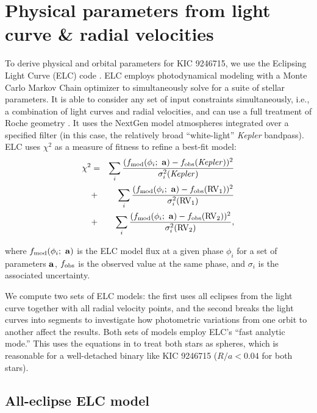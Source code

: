 \section{Physical parameters from light curve \& radial velocities}\label{model}
To derive physical and orbital parameters for KIC 9246715, we use the Eclipsing Light Curve (ELC) code \citep{oro00}. ELC employs photodynamical modeling with a Monte Carlo Markov Chain optimizer to simultaneously solve for a suite of stellar parameters. It is able to consider any set of input constraints simultaneously, i.e., a combination of light curves and radial velocities, and can use a full treatment of Roche geometry \citep{kop69,avn75}. It uses the NextGen model atmospheres integrated over a specified filter (in this case, the relatively broad ``white-light'' \emph{Kepler} bandpass). ELC uses $\chi^2$ as a measure of fitness to refine a best-fit model:
\begin{eqnarray}
\chi^2 & = &
\sum_i \frac{ (f_{\rm{mod}}(\phi_i; \ {\bf a}) - f_{\rm{obs}}(\rm{\it{Kepler}}))^2 }{\sigma_i^2(\rm{\it{Kepler}})} \nonumber \\
& + & \sum_i \frac{ (f_{\rm{mod}}(\phi_i; \ {\bf a}) - f_{\rm{obs}}(\rm{RV_1}))^2 }{\sigma_i^2(\rm{RV_1})} \nonumber \\
& + & \sum_i \frac{(f_{\rm{mod}}(\phi_i; \ {\bf a}) - f_{\rm{obs}}(\rm{RV_2}))^2}{\sigma_i^2(\rm{RV_2})},
\end{eqnarray}

where $f_{\rm{mod}}(\phi_i; \ {\bf a})$ is the ELC model flux at a given phase $\phi_i$ for a set of parameters ${\bf a}$, $f_{\rm{obs}}$ is the observed value at the same phase, and $\sigma_i$ is the associated uncertainty.

We compute two sets of ELC models: the first uses all eclipses from the light curve together with all radial velocity points, and the second breaks the light curves into segments to investigate how photometric variations from one orbit to another affect the results. Both sets of models employ ELC's ``fast analytic mode.'' This uses the equations in \citet{man02} to treat both stars as spheres, which is reasonable for a well-detached binary like KIC 9246715 ($R/a < 0.04$ for both stars).

\subsection{All-eclipse ELC model}

